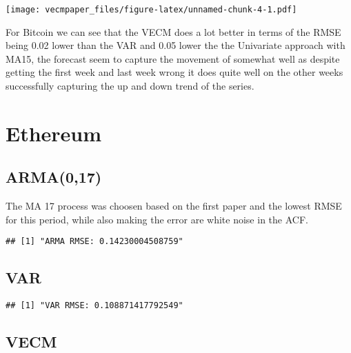 \documentclass[
]{article}
\newenvironment{Shaded}{\begin{snugshade}}{\end{snugshade}}
\newcommand{\DecValTok}[1]{\textcolor[rgb]{0.00,0.00,0.81}{#1}}
\newcommand{\FunctionTok}[1]{\textcolor[rgb]{0.00,0.00,0.00}{#1}}
\newcommand{\NormalTok}[1]{#1}
\newcommand{\OtherTok}[1]{\textcolor[rgb]{0.56,0.35,0.01}{#1}}
\newcommand{\SpecialCharTok}[1]{\textcolor[rgb]{0.00,0.00,0.00}{#1}}
\newcommand{\StringTok}[1]{\textcolor[rgb]{0.31,0.60,0.02}{#1}}
\begin{document}
\texttt{[image: vecmpaper\_files/figure-latex/unnamed-chunk-4-1.pdf]}

For Bitcoin we can see that the VECM does a lot better in terms of the
RMSE being 0.02 lower than the VAR and 0.05 lower the the Univariate
approach with MA15, the forecast seem to capture the movement of
somewhat well as despite getting the first week and last week wrong it
does quite well on the other weeks successfully capturing the up and
down trend of the series.

\hypertarget{ethereum}{%
\section{Ethereum}\label{ethereum}}

\hypertarget{arma017}{%
\subsection{ARMA(0,17)}\label{arma017}}

The MA 17 process was choosen based on the first paper and the lowest
RMSE for this period, while also making the error are white noise in the
ACF.

\begin{verbatim}
## [1] "ARMA RMSE: 0.14230004508759"
\end{verbatim}

\hypertarget{var-1}{%
\subsection{VAR}\label{var-1}}

\begin{verbatim}
## [1] "VAR RMSE: 0.108871417792549"
\end{verbatim}

\hypertarget{vecm-1}{%
\subsection{VECM}\label{vecm-1}}

\begin{Shaded}
\end{Shaded}
\end{document}
